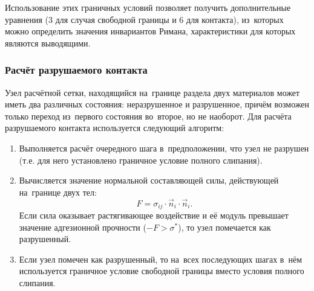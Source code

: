 \documentclass[thesis.tex]{subfiles}
\begin{document}
Использование этих граничных условий позволяет получить дополнительные уравнения (3 для случая свободной границы и 6
для контакта), из~которых можно определить значения инвариантов Римана, характеристики для которых являются выводящими.

\subsubsection{Расчёт разрушаемого контакта}

Узел расчётной сетки, находящийся на~границе раздела двух материалов может иметь два различных состояния:
неразрушенное и разрушенное, причём возможен только переход из~первого состояния во~второе, но не наоборот. Для расчёта
разрушаемого контакта используется следующий алгоритм:

\begin{enumerate}
    \item Выполняется расчёт очередного шага в~предположении, что узел не разрушен (т.е. для него установлено
          граничное условие полного слипания).
    \item Вычисляется значение нормальной составляющей силы, действующей на~границе двух тел:
          \[
              F = \sigma_{ij}\cdot \vec n_i \cdot \vec n_i.
          \]
          Если сила оказывает растягивающее воздействие и её модуль превышает значение адгезионной прочности
          ($-F > \sigma^*$), то узел помечается как разрушенный.
    \item Если узел помечен как разрушенный, то на~всех последующих шагах в~нём используется граничное условие свободной
          границы вместо условия полного слипания.
\end{enumerate}
\end{document}
